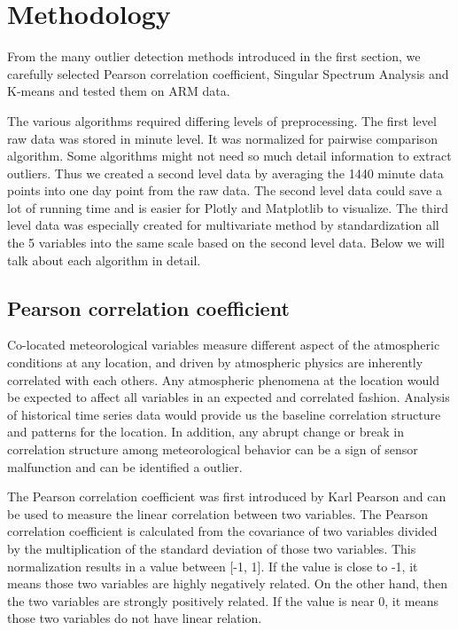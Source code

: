 \section{Methodology}
From the many outlier detection methods introduced in the first section,
we carefully selected Pearson correlation coefficient, Singular
Spectrum Analysis and K-means and tested them on ARM data. 

The
various algorithms required differing levels of preprocessing. The
first level raw data was stored in minute level. It was normalized
for pairwise comparison algorithm. Some algorithms might not need
so much detail information to extract outliers. Thus we created a
second level data by averaging the 1440 minute data points into one
day point from the raw data. The second level data could save a lot
of running time and is easier for Plotly \cite{plotly} and
Matplotlib \cite{Hunter:2007} to visualize. The third level data
was especially created for multivariate method by standardization
all the 5 variables into the same scale based on the second level
data. Below we will talk about each algorithm in detail. 

\subsection{Pearson correlation coefficient}
Co-located meteorological variables measure different aspect of the
atmospheric conditions at any location, and driven by atmospheric physics
are inherently correlated with each others. Any atmospheric phenomena at
the location would be expected to affect all variables in an expected
and correlated fashion.  Analysis of historical time
series data would provide us the baseline correlation structure and
patterns for the location. In addition, any abrupt change or break in
correlation structure among meteorological behavior can be a sign of
sensor malfunction and can be identified a outlier. 

The Pearson correlation coefficient was first introduced by Karl
Pearson\cite{pearson1895note} and can be used to measure the linear
correlation between two variables. The Pearson correlation coefficient
is calculated from the covariance of two variables divided by the
multiplication of the standard deviation of those two variables. This
normalization results in a value between [-1, 1]. If the value is close
to -1, it means those two variables are highly negatively related. On
the other hand, then the two variables are strongly positively related.
If the value is near 0, it means those two variables do not have linear
relation. 

